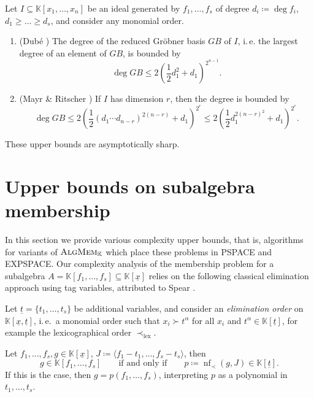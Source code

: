 \documentclass[12pt]{article}
\makeatletter
\newcommand{\KK}{\mathbb{K}}
\newcommand{\x}{{\underline x}}
\renewcommand{\t}{{\underline t}}
\DeclareMathOperator{\NF}{nf}
\newcommand{\problemText}[1]{\textsc{#1}\xspace}
\newcommand{\AlgMem}{\problemText{AlgMem}}
\newcommand{\cclass}[1]{\textsf{\textup{#1}}\xspace}
\newcommand{\PSPACE}{\cclass{PSPACE}}
\newcommand{\EXPSPACE}{\cclass{EXPSPACE}}
\newcommand{\ie}{i.\,e.\@\xspace}
\makeatother
\begin{document}
\begin{theorem}\label{thm:gb_dim_mayr_ritscher}
Let $I \subseteq \KK[x_1,\dots,x_n]$ be an ideal generated by $f_1,\dots,f_s$ of degree $d_i \coloneqq \deg f_i$, $d_1\geq \dots \geq d_s$, and consider any monomial order.
\begin{enumerate}
\item \textup{(Dubé \cite{Dube1990})} The degree of the reduced Gröbner basis $\textit{GB}$ of $I$, \ie the largest degree of an element of $\textit{GB}$, is bounded by
\[
\deg \textit{GB} \leq 2 \left( \frac{1}{2}d_1^2 + d_1\right)^{2^{n-1}}.
\]
\item \textup{(Mayr \& Ritscher \cite{Mayr2013})} If $I$ has dimension $r$, then the degree is bounded by
\[
\deg \textit{GB} \leq 2 \left( \frac{1}{2} (d_1\dotsm d_{n-r})^{2(n-r)} + d_1\right)^{2^r} \! \leq 2 \left( \frac{1}{2} d_1^{2(n-r)^2} + d_1\right)^{2^r}.
\]
\end{enumerate}
These upper bounds are asymptotically sharp.
\end{theorem}


\section{Upper bounds on subalgebra membership}\label{sec:upper_bounds}


In this section we provide various complexity upper bounds, that is, algorithms for variants of $\AlgMem_\KK$ which place these problems in \PSPACE and \EXPSPACE.
Our complexity analysis of the membership problem for a subalgebra $A = \KK[f_1,\dots,f_s] \subseteq \KK[\x]$ relies on the following classical elimination approach using tag variables, attributed to Spear \cite{Shannon1988, Spear1977}.

Let $\t = \{t_1,\dots,t_s\}$ be additional variables, and consider an \emph{elimination order} on $\KK[\x,\t]$, i.\,e.\ a monomial order such that $x_i \succ t^\alpha$ for all $x_i$ and $t^\alpha \in \KK[\t]$, for example the lexicographical order $\prec_{\text{lex}}$.

\begin{lemma}\label{thm:algmem_elimination}
Let $f_1,\dots,f_s,g \in \KK[\x]$, $J\coloneqq \langle f_1-t_1,\dots,f_s-t_s\rangle$, then
\[
g \in \KK[f_1,\dots,f_s] \qquad \text{if and only if} \qquad p \coloneqq \NF_\prec(g,J) \in \KK[\t].
\]
If this is the case, then $g = p(f_1,\dots,f_s)$, interpreting $p$ as a polynomial in $t_1,\dots,t_s$.
\end{lemma}
\end{document}
